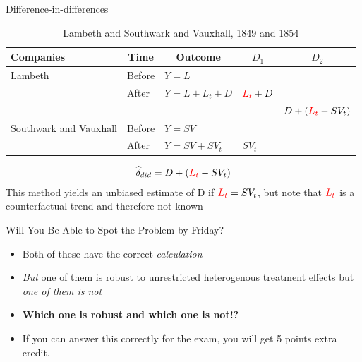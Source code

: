 \documentclass{beamer}
\begin{document}
\begin{frame}{Difference-in-differences}

\begin{table}\centering
\scriptsize
		\caption{Lambeth and Southwark and Vauxhall, 1849 and 1854}
		\begin{center}
		\begin{tabular}{lll|lc}
		\toprule
		\multicolumn{1}{l}{\textbf{Companies}}&
		\multicolumn{1}{c}{\textbf{Time}}&
		\multicolumn{1}{c}{\textbf{Outcome}}&
		\multicolumn{1}{c}{$D_1$}&
		\multicolumn{1}{c}{$D_2$}\\
		\midrule
		Lambeth & Before & $Y=L$ \\
		& After & $Y=L + L_t + D$ & $\textcolor{red}{L_t}+D$\\
		\midrule
		& & & & $D + (\textcolor{red}{L_t}- SV_t)$ \\
		\midrule
		Southwark and Vauxhall & Before & $Y=SV$ \\
		& After & $Y=SV + SV_t$ & $SV_t$\\
		\bottomrule
		\end{tabular}
		\end{center}
	\end{table}

\begin{eqnarray*}
\widehat{\delta}_{did} = D + (\textcolor{red}{L_t}- SV_t)
\end{eqnarray*}This method yields an unbiased estimate of D if $\textcolor{red}{L_t} = SV_t$, but note that $\textcolor{red}{L_t}$ is a counterfactual trend and therefore not known

\end{frame}

\begin{frame}{Will You Be Able to Spot the Problem by Friday?}

\begin{itemize}
\item Both of these have the correct \emph{calculation}
\item \emph{But} one of them is robust to unrestricted heterogenous treatment effects but \emph{one of them is not}
\item \textbf{Which one is robust and which one is not!?}
\item If you can answer this correctly for the exam, you will get 5 points extra credit. 
\end{itemize}

\end{frame}
\end{document}
